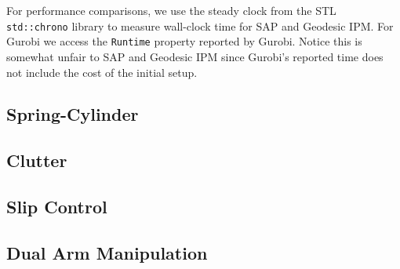 For performance comparisons, we use the steady clock from the STL
\verb+std::chrono+ library to measure wall-clock time for SAP and Geodesic IPM.
For Gurobi we access the \verb+Runtime+ property reported by Gurobi. Notice this
is somewhat unfair to SAP and Geodesic IPM since Gurobi's reported time does not
include the cost of the initial setup.

\subsection{Spring-Cylinder}
\label{sec:spring_cylinder}


\subsection{Clutter}
\label{sec:clutter}


\subsection{Slip Control}
\label{sec:slip_control}


\subsection{Dual Arm Manipulation}
\label{sec:dual_arm}

